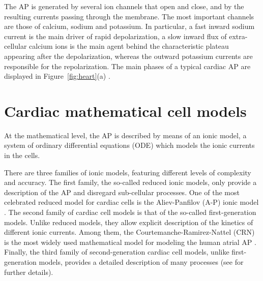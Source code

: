 \documentclass[11pt,a4paper]{article}
\begin{document}
The AP is generated by several ion channels that open and close, and by
the resulting currents passing through the membrane. The most important
channels are those of calcium, sodium and potassium. In particular, a fast
inward sodium current is the main driver of rapid depolarization, a slow
inward flux of extra-cellular calcium ions is the main agent behind the characteristic plateau appearing after the depolarization, whereas the outward
potassium currents are responsible for the repolarization. The main phases of a typical cardiac AP are displayed in Figure~\ref{fig:heart}(a) \cite{quarteroni2019,franzone2014mathematical}.


\section{Cardiac mathematical cell models}\label{sec:math}
At the mathematical level, the AP is described by means of an ionic model, a system of ordinary differential equations (ODE) which models the ionic currents in the cells.

There are three families of ionic models, featuring different levels of complexity and accuracy. The first family, the so-called reduced ionic models, only provide a description of the AP and disregard sub-cellular processes. One of the most celebrated reduced model for cardiac cells is the Aliev-Panfilov (A-P) ionic model \cite{aliev1996simple}. The second family of cardiac cell models is that of the so-called first-generation models. Unlike reduced models, they allow explicit description of the kinetics of different ionic currents. Among them, the Courtemanche-Ramirez-Nattel (CRN) is the most widely used mathematical model for modeling the human atrial AP \cite{courtemanche1998ionic}. Finally, the third family of second-generation cardiac cell models, unlike first-generation models, provides a detailed description of many processes (see \cite{quarteroni2019,franzone2014mathematical} for further details). 
 
\end{document}
